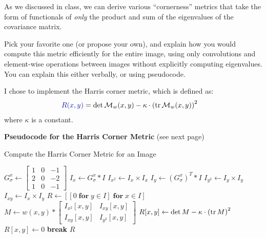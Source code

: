 \begin{problem}
  As we discussed in class, we can derive various ``cornerness'' metrics
  that take the form of functionals of \emph{only} the product
  and sum of the eigenvalues of the covariance matrix.
  
  \step
  Pick your favorite one (or propose your own),
  and explain how you would compute this metric efficiently
  for the entire image, using only convolutions and
  element-wise operations between images
  without explicitly computing eigenvalues.
  You can explain this either verbally, or using pseudocode.
\end{problem}

  \bigskip
  
  \step
  I chose to implement the Harris corner metric, which is defined as:
  \begin{align}
    \zaff{R(x,y)} &= \det \calM_w(x,y) - \kappa \cdot {(\tr \calM_w(x,y))}^2
  \end{align}
  where $\kappa$ is a constant.


  \step
  \textbf{Pseudocode for the Harris Corner Metric} (see next page)
  \begin{algorithm}
    \caption{Compute the Harris Corner Metric for an Image}\label{alg:harris-metric}
    \begin{algorithmic}
        \State $G_\sigma^x \gets \begin{bmatrix} 1 & 0 & -1 \\ 2 & 0 & -2 \\ 1 & 0 & -1 \end{bmatrix}$ 
        \State $I_x \gets G_\sigma^x \ast I$
        \State $I_{x^2} \gets I_x \times I_x$
        \State $I_y \gets {(G_\sigma^x)}^T \ast I$
        \State $I_{y^2} \gets I_y \times I_y$
        \State $I_{xy} \gets I_x \times I_y$
        \State $R \gets [[0\; \mathbf{for}\;  y \in I]\; \mathbf{for}\; x \in I]$ 
            \State $M \gets w(x, y) \ast \begin{bmatrix} I_{x^2}[x,y] & I_{xy}[x,y] \\ I_{xy}[x,y] & I_{y^2}[x,y] \end{bmatrix}$ 
            \State $R[x,y] \gets \det M - \kappa \cdot {(\operatorname{tr}M)}^2$ 
          \EndFor
        \EndFor
                \State $R[x,y] \gets 0$ 
                \State \textbf{break}
              \EndIf
            \EndFor
          \EndFor
        \EndFor
        \State \Return $R$
      \EndProcedure
    \end{algorithmic}
  \end{algorithm}
